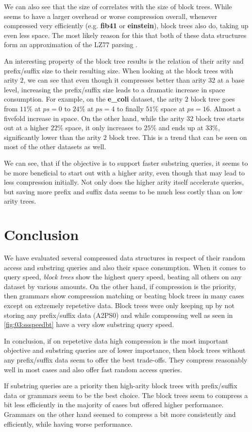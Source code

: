 \documentclass{scrartcl}
\begin{document}
We can also see that the size of \lzend{} correlates with the size of block trees.
While \lzend{} seems to have a larger overhead or worse compression overall, whenever \lzend{} compressed very efficiently (e.g. \textbf{fib41} or \textbf{einstein}),
block trees also do, taking up even less space.
The most likely reason for this that both of these data structures form an approximation of the LZ77 parsing \cite{ziv_universal_1977,belazzougui_block_2021,kempa_lz-end_2017}.

An interesting property of the block tree results is the relation of their arity and prefix/suffix size to their resulting size.
When looking at the block trees with arity $2$, we can see that even though it compresses better than arity $32$ at a base level,
increasing the prefix/suffix size leads to a dramatic increase in space consumption.
For example, on the \textbf{e\_coli} dataset, the arity $2$ block tree goes from $11\%$ at $ps = 0$ to $24\%$ at $ps=4$ to finally $51\%$ space at $ps=16$.
Almost a fivefold increase in space.
On the other hand, while the arity $32$ block tree starts out at a higher $22\%$ space, it only increases to $25\%$ and ends up at $33\%$, significantly lower than the arity $2$ block tree.
This is a trend that can be seen on most of the other datasets as well.

We can see, that if the objective is to support faster substring queries, it seems to be more beneficial to start out with a higher arity, even though that may lead to less compression initially.
Not only does the higher arity itself accelerate queries, but saving more prefix and suffix data seems to be much less costly than on low arity trees.

\section{Conclusion}

We have evaluated several compressed data structures in respect of their random access and substring queries and also their space consumption.
When it comes to query speed, \emph{block trees} show the highest query speed, beating all others on any dataset by various amounts.
On the other hand, if compression is the priority, then grammars show compression matching or beating block trees in many cases except on extremely repetetive data.
Block trees were only keeping up by not storing any prefix/suffix data (A2PS0) and while compressing well as seen in \cref{fig:03:ssspeedbt} have a very slow substring query speed.

In conclusion, if on repetetive data high compression is the most important objective and substring queries are of lower importance,
then block trees without any prefix/suffix data seem to offer the best trade-offs.
They compress reasonably well in most cases and also offer fast random access queries.

If substring queries are a priority then high-arity block trees with prefix/suffix data or grammars seem to be the best choice.
The block trees seem to compress a bit less efficiently in the majority of cases but offered higher performance.
Grammars on the other hand seemed to compress a bit more consistently and efficiently, while having worse performance.


\end{document}
